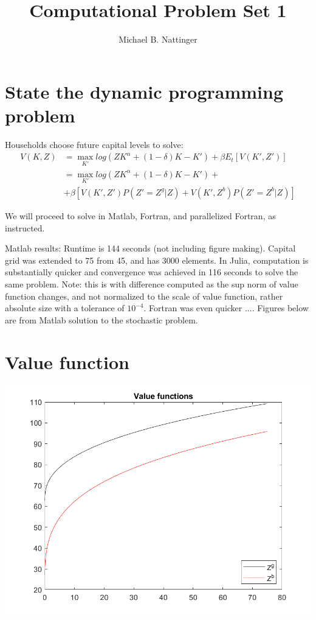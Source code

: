 \documentclass[11pt]{article} %
\title{Computational Problem Set 1}
\author{Michael B. Nattinger}
\begin{document}
\maketitle

\section{State the dynamic programming problem}
Households choose future capital levels to solve:
\begin{align*}
V(K,Z) &= \max_{K'} log(ZK^{\alpha} + (1-\delta)K - K') + \beta E_t[V(K',Z')]\\
&=  \max_{K'} log(ZK^{\alpha} + (1-\delta)K - K') + \\ &+ \beta[V(K',Z')P(Z' = Z^g|Z) + V(K',Z^b)P(Z' = Z^b|Z)]
\end{align*}

We will proceed to solve in Matlab, Fortran, and parallelized Fortran, as instructed.

Matlab results: Runtime is 144 seconds (not including figure making). Capital grid was extended to 75 from 45, and has 3000 elements. In Julia, computation is substantially quicker and convergence was achieved in 116 seconds to solve the same problem. Note: this is with difference computed as the sup norm of value function changes, and not normalized to the scale of value function, rather absolute size with a tolerance of $10^{-4}$. Fortran was even quicker .... Figures below are from Matlab solution to the stochastic problem.

\section{Value function}
\includegraphics{value}
\end{document}

